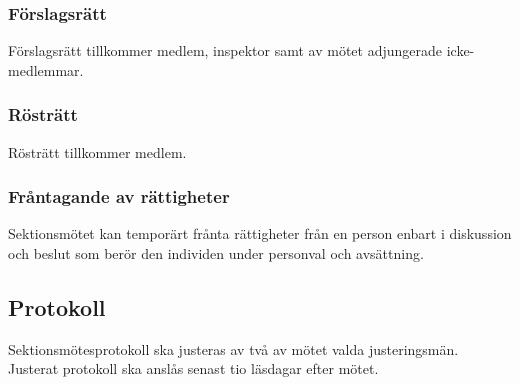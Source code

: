 \subsubsection{Förslagsrätt}
Förslagsrätt tillkommer medlem, inspektor samt av mötet adjungerade icke-medlemmar.
\subsubsection{Rösträtt}
Rösträtt tillkommer medlem.
\subsubsection{Fråntagande av rättigheter}
Sektionsmötet kan temporärt frånta rättigheter från en person enbart i diskussion och beslut som berör den individen under personval och avsättning. 
\subsection{Protokoll}
Sektionsmötesprotokoll ska justeras av två av mötet valda justeringsmän. Justerat protokoll ska anslås senast tio läsdagar efter mötet.
